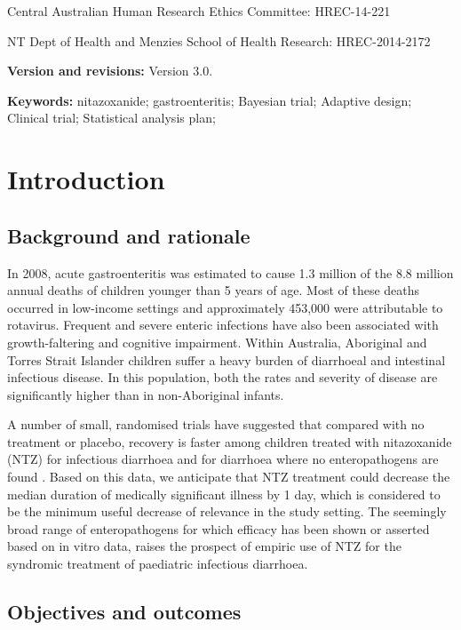 \documentclass[a4paper]{article}
\begin{document}
\setlength{\leftskip}{1cm}Central Australian Human Research
Ethics Committee: HREC-14-221

\setlength{\leftskip}{1cm}NT Dept of Health and Menzies School of Health
Research: HREC-2014-2172

\setlength{\leftskip}{0pt}
{\bf Version and revisions:} Version 3.0.

{\bf Keywords:} nitazoxanide; gastroenteritis; Bayesian trial; Adaptive design; Clinical trial; Statistical analysis plan;


\clearpage

\tableofcontents

\clearpage


\section{Introduction}

\subsection{Background and rationale}

In 2008, acute gastroenteritis was estimated to cause 1.3 million of the 8.8 million annual deaths of children younger than 5 years of age.
Most of these deaths occurred in low-income settings and approximately 453,000 were attributable to rotavirus.
Frequent and severe enteric infections have also been associated with growth-faltering and cognitive impairment.
Within Australia, Aboriginal and Torres Strait Islander children suffer a heavy burden of diarrhoeal and intestinal infectious disease.
In this population, both the rates and severity of disease are significantly higher than in non-Aboriginal infants.

A number of small, randomised trials have suggested that compared with no treatment or placebo, recovery is faster among children treated with nitazoxanide (NTZ) for infectious diarrhoea and for diarrhoea where no enteropathogens are found \cite{Waddingtone019632}.
Based on this data, we anticipate that NTZ treatment could decrease the median duration of medically significant illness by 1 day, which is considered to be the minimum useful decrease of relevance in the study setting.
The seemingly broad range of enteropathogens for which efficacy has been shown or asserted based on in vitro data, raises the prospect of empiric use of NTZ for the syndromic treatment of paediatric infectious diarrhoea.


\subsection{Objectives and outcomes}
\end{document}
